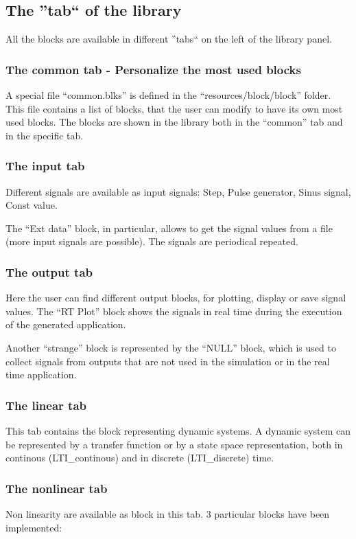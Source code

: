 \subsection{The ''tab`` of the library}

All the blocks are available in different ''tabs`` on the left of the library panel.

\subsubsection{The common tab - Personalize the most used blocks}
A special file ``common.blks'' is defined in the ``resources/block/block'' folder. This file contains a list of blocks, that the user can modify to have its own most used blocks. The blocks are shown in the library both in the ``common'' tab and in the specific tab.

\subsubsection{The input tab}
Different signals are available as input signals: Step, Pulse generator, Sinus signal, Const value. 

The ``Ext data'' block, in particular, allows to get the signal values from a file (more input signals are possible). The signals are periodical repeated.

\subsubsection{The output tab}
Here the user can find different output blocks, for plotting, display or save signal values. The ``RT Plot'' block shows the signals in real time during the execution of the generated application.

Another ``strange'' block is represented by the ``NULL'' block, which is used to collect signals from outputs that are not used in the simulation or in the real time application.

\subsubsection{The linear tab}
This tab contains the block representing dynamic systems. A dynamic system can be represented by a transfer function or by a state space representation, both in continous (LTI\_continous) and in discrete (LTI\_discrete) time.

\subsubsection{The nonlinear tab}
Non linearity are available as block in this tab. 3 particular blocks have been implemented:

